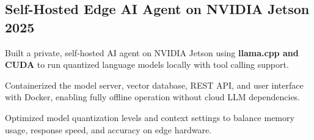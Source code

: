 
\subsection{Self-Hosted Edge AI Agent on NVIDIA Jetson \texorpdfstring{\hfill}{ } 2025}
\begin{zitemize}
\item Built a private, self-hosted AI agent on NVIDIA Jetson using \textbf{llama.cpp and CUDA} to run quantized language models locally with tool calling support.
\item Containerized the model server, vector database, REST API, and user interface with Docker, enabling fully offline operation without cloud LLM dependencies.
\item Optimized model quantization levels and context settings to balance memory usage, response speed, and accuracy on edge hardware.
\end{zitemize}
